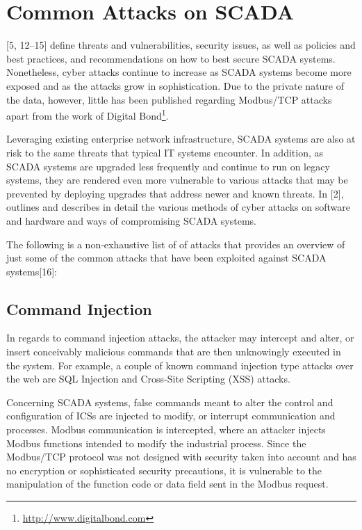 \documentclass[11pt,]{article}
\let\rmarkdownfootnote\footnote%
\def\footnote{\protect\rmarkdownfootnote}
\begin{document}
\clearpage

\section{Common Attacks on SCADA}\label{common-attacks-on-scada}

{[}5, 12--15{]} define threats and vulnerabilities, security issues, as
well as policies and best practices, and recommendations on how to best
secure SCADA systems. Nonetheless, cyber attacks continue to increase as
SCADA systems become more exposed and as the attacks grow in
sophistication. Due to the private nature of the data, however, little
has been published regarding Modbus/TCP attacks apart from the work of
Digital Bond\footnote{\url{http://www.digitalbond.com}}.

Leveraging existing enterprise network infrastructure, SCADA systems are
also at risk to the same threats that typical IT systems encounter. In
addition, as SCADA systems are upgraded less frequently and continue to
run on legacy systems, they are rendered even more vulnerable to various
attacks that may be prevented by deploying upgrades that address newer
and known threats. In {[}2{]}, outlines and describes in detail the
various methods of cyber attacks on software and hardware and ways of
compromising SCADA systems.

The following is a non-exhaustive list of of attacks that provides an
overview of just some of the common attacks that have been exploited
against SCADA systems{[}16{]}:

\subsection{Command Injection}\label{command-injection}

In regards to command injection attacks, the attacker may intercept and
alter, or insert conceivably malicious commands that are then
unknowingly executed in the system. For example, a couple of known
command injection type attacks over the web are SQL Injection and
Cross-Site Scripting (XSS) attacks.

Concerning SCADA systems, false commands meant to alter the control and
configuration of ICSs are injected to modify, or interrupt communication
and processes. Modbus communication is intercepted, where an attacker
injects Modbus functions intended to modify the industrial process.
Since the Modbus/TCP protocol was not designed with security taken into
account and has no encryption or sophisticated security precautions, it
is vulnerable to the manipulation of the function code or data field
sent in the Modbus request.
\end{document}
